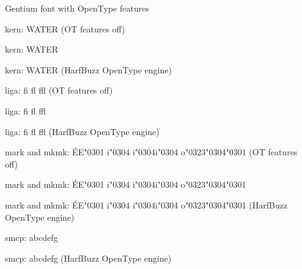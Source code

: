 \page

Gentium font with OpenType features\par
\smallskip
kern: {\gentiumOToff WATER} (OT features off)\par
kern: WATER\par
kern: {\gentiumHB WATER} (HarfBuzz OpenType engine)\par
\smallskip
liga: {\gentiumOToff fi fl ffl} (OT features off)\par
liga: fi fl ffl\par
liga: {\gentiumHB fi fl ffl} (HarfBuzz OpenType engine)\par
\smallskip
mark and mkmk: {\gentiumOToff ÉE{\char"0301} i{\char"0304} i{\char"0304}i{\char"0304} o{\char"0323}{\char"0304}{\char"0301}} (OT features off)\par
mark and mkmk: ÉE{\char"0301} i{\char"0304} i{\char"0304}i{\char"0304} o{\char"0323}{\char"0304}{\char"0301}\par
mark and mkmk: {\gentiumHB ÉE{\char"0301} i{\char"0304} i{\char"0304}i{\char"0304} o{\char"0323}{\char"0304}{\char"0301}} (HarfBuzz OpenType engine)\par
\smallskip
smcp: {\gentiumSC abcdefg}\par
smcp: {\gentiumHBSC abcdefg} (HarfBuzz OpenType engine)\par

